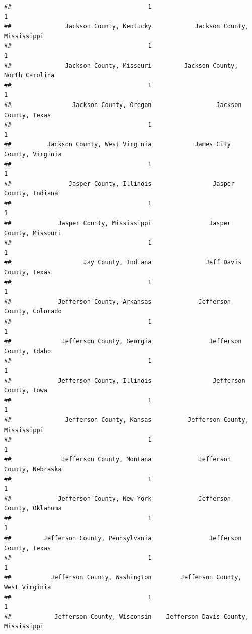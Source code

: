 \documentclass[
]{article}
\begin{document}
\begin{verbatim}
##                                      1                                      1 
##               Jackson County, Kentucky            Jackson County, Mississippi 
##                                      1                                      1 
##               Jackson County, Missouri         Jackson County, North Carolina 
##                                      1                                      1 
##                 Jackson County, Oregon                  Jackson County, Texas 
##                                      1                                      1 
##          Jackson County, West Virginia            James City County, Virginia 
##                                      1                                      1 
##                Jasper County, Illinois                 Jasper County, Indiana 
##                                      1                                      1 
##             Jasper County, Mississippi                Jasper County, Missouri 
##                                      1                                      1 
##                    Jay County, Indiana               Jeff Davis County, Texas 
##                                      1                                      1 
##             Jefferson County, Arkansas             Jefferson County, Colorado 
##                                      1                                      1 
##              Jefferson County, Georgia                Jefferson County, Idaho 
##                                      1                                      1 
##             Jefferson County, Illinois                 Jefferson County, Iowa 
##                                      1                                      1 
##               Jefferson County, Kansas          Jefferson County, Mississippi 
##                                      1                                      1 
##              Jefferson County, Montana             Jefferson County, Nebraska 
##                                      1                                      1 
##             Jefferson County, New York             Jefferson County, Oklahoma 
##                                      1                                      1 
##         Jefferson County, Pennsylvania                Jefferson County, Texas 
##                                      1                                      1 
##           Jefferson County, Washington        Jefferson County, West Virginia 
##                                      1                                      1 
##            Jefferson County, Wisconsin    Jefferson Davis County, Mississippi 

\end{verbatim}
\end{document}
